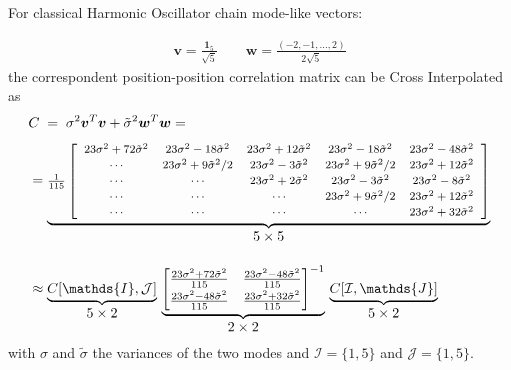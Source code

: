 \begin{example}
For classical Harmonic Oscillator chain mode-like vectors: 

\[
\begin{alignedat}{2}      
	\boldsymbol{v} = \frac{\boldsymbol{1}_5}{\sqrt{5}} \qquad \boldsymbol{w} = \frac{(-2,-1,\dots,2)}{2\sqrt{5}}
\end{alignedat}
\]
the correspondent position-position correlation matrix can be Cross Interpolated as 
\begin{equation}
	\label{eq:CIcorrmat}
	\begin{aligned}
	  & C  \;=\; \sigma^2 \boldsymbol{v}^T \boldsymbol{v} + \tilde{\sigma}^2 \boldsymbol{w}^T\boldsymbol{w} = \\[.4em]
	  & {}=  \underbrace{%
	  \mbox{\footnotesize$
	  \frac{1}{115}\left[\begin{array}{ccccc}
		23\sigma^2 + 72\tilde{\sigma}^2  & 23\sigma^2 - 18\tilde{\sigma}^2 & 23\sigma^2 + 12 \tilde{\sigma}^2  & 23\sigma^2 - 18\tilde{\sigma}^2 & 23\sigma^2 - 48\tilde{\sigma}^2 \\[0.2em]
		\cdots  & 23\sigma^2 + 9\tilde{\sigma}^2/2 & 23\sigma^2 - 3\tilde{\sigma}^2 & 23\sigma^2 + 9\tilde{\sigma}^2/2 & 23\sigma^2 + 12\tilde{\sigma}^2 \\[0.2em]
		\cdots & \cdots & 23\sigma^2 + 2\tilde{\sigma}^2 & 23\sigma^2 - 3\tilde{\sigma}^2 & 23\sigma^2 - 8\tilde{\sigma}^2 \\[0.2em]
		\cdots  & \cdots & \cdots &  23\sigma^2 + 9\tilde{\sigma}^2/2 & 23\sigma^2 + 12\tilde{\sigma}^2 \\[0.2em]
		\cdots  & \cdots & \cdots & \cdots & 23\sigma^2 + 32\tilde{\sigma}^2
	  \end{array}\right]$}
	  }_{\displaystyle 5 \times 5}
	  \\[1.2em]
	  & {}\approx
	\underbrace{%
	  C[\mathds{I} , \mathcal{J}]}_{\displaystyle 5 \times 2}
	\,
	\underbrace{%
	  \begin{bmatrix}
		\frac{23\sigma^2 + 72\tilde{\sigma}^2}{115} & \frac{23\sigma^2  -48 \tilde{\sigma}^2}{115} \\[0.2em]
		\frac{23\sigma^2 - 48\tilde{\sigma}^2}{115} & \frac{23\sigma^2 + 32\tilde{\sigma}^2}{115} 
	  \end{bmatrix}^{-1}}_{\displaystyle 2 \times 2}
	  \,
	  \underbrace{%
	  C[\mathcal{I} , \mathds{J}]}_{\displaystyle 5 \times 2}
	\end{aligned}
\end{equation}
with $\sigma$ and $\tilde{\sigma}$ the variances of the two modes and $\mathcal{I} = \{ 1,5\}$ and $\mathcal{J} = \{ 1,5\}$. 
\end{example}

